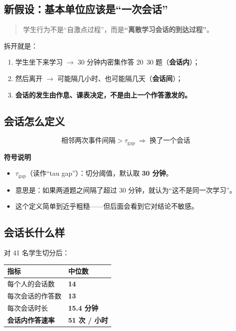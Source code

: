 \documentclass[UTF8,a4paper,11pt]{ctexart}
\newenvironment{explainbox}[1]
{\begin{center}\begin{minipage}{0.94\textwidth}\colorbox{boxbg}{\parbox{0.92\textwidth}{\textbf{#1}\par\vspace{2pt}}}}
{\end{minipage}\end{center}}
\begin{document}
\subsection{新假设：基本单位应该是“一次会话”}

\begin{quote}
学生行为不是“自激点过程”，而是\textbf{“离散学习会话的到达过程”}。
\end{quote}

拆开就是：

\begin{enumerate}[leftmargin=2em]
\item 学生坐下来学习 $\to$ 30 分钟内密集作答 20~30 题（\textbf{会话内}）；
\item 然后离开 $\to$ 可能隔几小时、也可能隔几天（\textbf{会话间}）；
\item \textbf{会话的发生由作息、课表决定，不是由上一个作答激发的。}
\end{enumerate}

\subsection{会话怎么定义}

\begin{equation}
\text{相邻两次事件间隔} > \tau_{\text{gap}} \;\Longrightarrow\; \text{换了一个会话}
\end{equation}

\begin{explainbox}{符号说明}
\begin{itemize}[leftmargin=1.4em,itemsep=1pt]
\item $\tau_{\text{gap}}$（读作“tau gap”）：切分阈值，默认取 \textbf{30 分钟}。
\item 意思是：如果两道题之间隔了超过 30 分钟，就认为“这不是同一次学习”。
\item 这个定义简单到近乎粗糙——但后面会看到它对结论不敏感。
\end{itemize}
\end{explainbox}

\subsection{会话长什么样}

对 41 名学生切分后：

\begin{center}
\begin{tabular}{p{6.6cm}p{6.6cm}}
\toprule
\textbf{指标} & \textbf{中位数} \\
\midrule
每个人的会话数 & \textbf{14} \\
每次会话的作答数 & \textbf{13} \\
每次会话时长 & \textbf{15.4 分钟} \\
\textbf{会话内作答速率} & \textbf{51 次 / 小时} \\
\bottomrule
\end{tabular}
\end{center}
\end{document}
